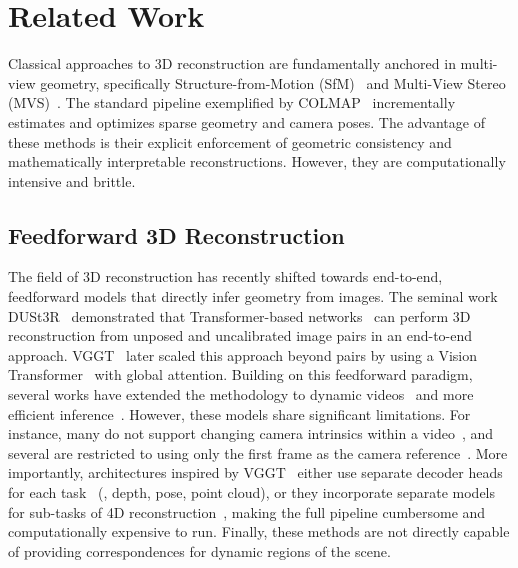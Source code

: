 



\section{Related Work}
\label{sec:related}

Classical approaches to 3D reconstruction are fundamentally anchored in multi-view geometry, specifically Structure-from-Motion (SfM)~\cite{hartley2003multiple, oliensis2000critique} and Multi-View Stereo (MVS)~\cite{furukawa2015stereo,schonberger2016pixelwise}.
The standard pipeline exemplified by COLMAP~\cite{schonberger2016structure} incrementally estimates and optimizes sparse geometry and camera poses.
The advantage of these methods is their explicit enforcement of geometric consistency and mathematically interpretable reconstructions.
However, they are computationally intensive and brittle.

\subsection{Feedforward 3D Reconstruction}
\label{sec:related:recon}
The field of 3D reconstruction has recently shifted towards end-to-end, feedforward models that directly infer geometry from images.
The seminal work DUSt3R~\cite{wang2024dust3r} 
demonstrated that Transformer-based networks~\cite{AttentionIsAllYouNeed} can perform 3D reconstruction from unposed and uncalibrated image pairs in an end-to-end approach.
VGGT~\cite{wang2025vggt} later scaled this approach beyond pairs by using a Vision Transformer~\cite{dosovitskiy2021} with global attention.
Building on this feedforward paradigm, several works have extended the methodology to dynamic videos~\cite{zhang2024monst3r, wang2025cut3r, wang2025c4d, chen2025easi3r} and more efficient inference~\cite{wang2025pi, yang2025fast3r}.
However, these models share significant limitations.
For instance, many do not support changing camera intrinsics within a video~\cite{wang2025pi, wang2025vggt, li2025megasam}, and several are restricted to using only the first frame as the camera reference~\cite{wang2024dust3r,li2025megasam, wang2025cut3r}.
More importantly, architectures inspired by VGGT~\cite{wang2025vggt} either use separate decoder heads for each task~\cite{zhang2024monst3r, wang2025cut3r, wang2025pi} (\eg, depth, pose, point cloud), or they incorporate separate models for sub-tasks of 4D reconstruction~\cite{wang2025c4d,lu2025align3r, sucar2025dynamic}, making the full pipeline cumbersome and computationally expensive to run.
Finally, these methods are not directly capable of providing correspondences for dynamic regions of the scene.


